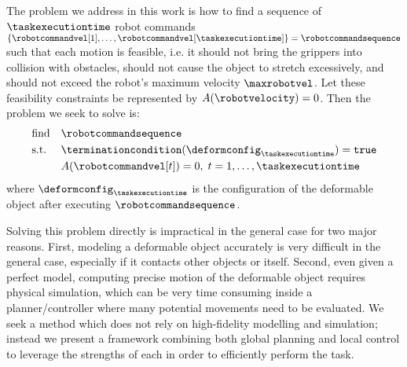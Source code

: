 The problem we address in this work is how to find a sequence of $\taskexecutiontime$ robot commands $\{ \robotcommandvel[1], \dots, \robotcommandvel[\taskexecutiontime] \} = \robotcommandsequence$ such that each motion is feasible, i.e. it should not bring the grippers into collision with obstacles, should not cause the object to stretch excessively, and should not exceed the robot's maximum velocity $\maxrobotvel$. Let these feasibility constraints be represented by $A(\robotvelocity) = 0$. Then the problem we seek to solve is:
\begin{equation}
    \begin{aligned}
        & \text{find}   & & \robotcommandsequence \\
        & \text{s.t.}   & & \terminationcondition(\deformconfig_{\taskexecutiontime}) = \texttt{true} \\
        &               & & A(\robotcommandvel[t])                                    = 0, \; t = 1, \dots, \taskexecutiontime
    \end{aligned}
    \label{eqn:main_problem_statement}
\end{equation}
where $\deformconfig_{\taskexecutiontime}$ is the configuration of the deformable object after executing $\robotcommandsequence$.

Solving this problem directly is impractical in the general case for two major reasons. First, modeling a deformable object accurately is very difficult in the general case, especially if it contacts other objects or itself. Second, even given a perfect model, computing precise motion of the deformable object requires physical simulation, which can be very time consuming inside a planner/controller where many potential movements need to be evaluated. We seek a method which does not rely on high-fidelity modelling and simulation; instead we present a framework combining both global planning and local control to leverage the strengths of each in order to efficiently perform the task.
